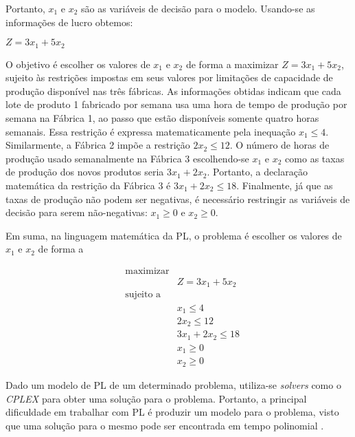 Portanto, $x_1$ e $x_2$ são as variáveis de decisão para o modelo. Usando-se as informações de lucro obtemos:

\begin{alineas}
\item[] $Z = 3x_1 + 5x_2$
\end{alineas}

O objetivo é escolher os valores de $x_1$ e $x_2$ de forma a maximizar $Z = 3x_1 + 5x_2$, sujeito às restrições impostas em seus valores por limitações de capacidade de produção disponível nas três fábricas. As informações obtidas indicam que cada lote de produto 1 fabricado por semana usa uma hora de tempo de produção por semana na Fábrica 1, ao passo que estão disponíveis somente quatro horas semanais. Essa restrição é expressa matematicamente pela inequação $x_1 \leq 4$. Similarmente, a Fábrica 2 impõe a restrição $2x_2 \leq 12$. O número de horas de produção usado semanalmente na Fábrica 3 escolhendo-se $x_1$ e $x_2$ como as taxas de produção dos novos produtos seria $3x_1 + 2x_2$. Portanto, a declaração matemática da restrição da Fábrica 3 é $3x_1 + 2x_2 \leq 18$. Finalmente, já que as taxas de produção não podem ser negativas, é necessário restringir as variáveis de decisão para serem não-negativas: $x_1 \geq 0$ e $x_2 \geq 0$.

Em suma, na linguagem matemática da PL, o problema é escolher os valores de $x_1$ e $x_2$ de forma a

\begin{equation*}
\begin{aligned}
& \text{maximizar} \\
& &  Z = 3x_1 + 5x_2 \\
& \text{sujeito a} \\
& & x_1 \leq 4 \\
& & 2x_2 \leq 12 \\
& & 3x_1 + 2x_2 \leq 18 \\
& & x_1 \geq 0 \\ 
& & x_2 \geq 0
\end{aligned}
\end{equation*}

Dado um modelo de PL de um determinado problema, utiliza-se \textit{solvers} como o \textit{CPLEX} \cite{ibmcplex} para obter uma solução para o problema. Portanto, a principal dificuldade em trabalhar com PL é produzir um modelo para o problema, visto que uma solução para o mesmo pode ser encontrada em tempo polinomial \cite{luenberger1984linear}.

